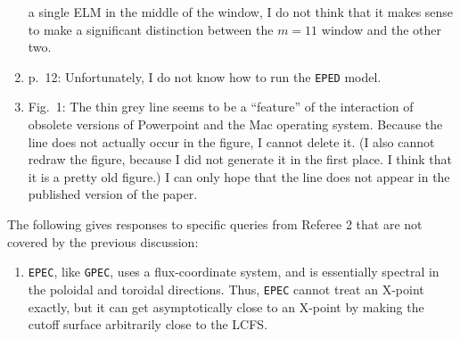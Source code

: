 \documentclass{article}[12pt]
\begin{document}
\begin{enumerate}
a single ELM in the middle of the window, I do not think that it makes sense to make a significant distinction between the $m=11$
window and the other two. 
\item p.~12: Unfortunately, I do not know how to run the {\tt EPED} model. 
\item Fig.~1: The thin grey line seems to be a ``feature'' of the interaction of obsolete versions of Powerpoint and the Mac operating system.
Because the line does not actually occur in the figure, I cannot delete it. (I also cannot redraw the figure, because I did not generate it in the first place. I think that it is a pretty old figure.) I can only hope that the line does not appear in the published version of the paper. 
\end{enumerate}

The following gives responses to specific queries from Referee 2 that are not covered by the previous discussion:
\begin{enumerate}
\item {\tt EPEC}, like {\tt GPEC}, uses a flux-coordinate system, and is essentially spectral in the poloidal and toroidal directions. Thus,
{\tt EPEC} cannot treat an X-point exactly, but it can get asymptotically close to an X-point by making the cutoff surface arbitrarily close to
the LCFS. 
\end{enumerate}
\end{document}
